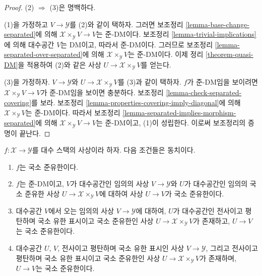 \begin{proof}
(2) $\Rightarrow$ (3)은 명백하다.

\medskip\noindent
(1)을 가정하고 $V \to \mathcal{Y}$를 (2)와 같이 택하자. 그러면
보조정리 \ref{lemma-base-change-separated}에 의해
$\mathcal{X} \times_\mathcal{Y} V \to V$는 준-DM이다.
보조정리 \ref{lemma-trivial-implications}에 의해 대수공간 $V$는 DM이고,
따라서 준-DM이다. 그러므로 보조정리
\ref{lemma-separated-over-separated}에 의해
$\mathcal{X} \times_\mathcal{Y} V$는 준-DM이다. 이제 정리
\ref{theorem-quasi-DM}을 적용하여 (2)와 같은 사상
$U \to \mathcal{X} \times_\mathcal{Y} V$를 얻는다.

\medskip\noindent
(3)을 가정하자. $V \to \mathcal{Y}$와
$U \to \mathcal{X} \times_\mathcal{Y} V$를 (3)과 같이 택하자.
$f$가 준-DM임을 보이려면
$\mathcal{X} \times_\mathcal{Y} V \to V$가 준-DM임을 보이면 충분하다.
보조정리 \ref{lemma-check-separated-covering}를 보라.
보조정리 \ref{lemma-properties-covering-imply-diagonal}에 의해
$\mathcal{X} \times_\mathcal{Y} V$는 준-DM이다. 따라서 보조정리
\ref{lemma-separated-implies-morphism-separated}에 의해
$\mathcal{X} \times_\mathcal{Y} V \to V$는 준-DM이고, (1)이 성립한다.
이로써 보조정리의 증명이 끝난다.
\end{proof}

\begin{lemma}
\label{lemma-characterize-locally-quasi-finite}
$f : \mathcal{X} \to \mathcal{Y}$를 대수 스택의 사상이라 하자.
다음 조건들은 동치이다.
\begin{enumerate}
\item $f$는 국소 준유한이다.
\item $f$는 준-DM이고, $V$가 대수공간인 임의의 사상
$V \to \mathcal{Y}$와 $U$가 대수공간인 임의의 국소 준유한 사상
$U \to \mathcal{X} \times_\mathcal{Y} V$에 대하여 사상 $U \to V$가
국소 준유한이다.
\item 대수공간 $V$에서 오는 임의의 사상 $V \to \mathcal{Y}$에 대하여,
$U$가 대수공간인 전사이고 평탄하며 국소 유한 표시이고 국소 준유한인
사상 $U \to \mathcal{X} \times_\mathcal{Y} V$가 존재하고,
$U \to V$는 국소 준유한이다.
\item 대수공간 $U$, $V$, 전사이고 평탄하며 국소 유한 표시인 사상
$V \to \mathcal{Y}$, 그리고 전사이고 평탄하며 국소 유한 표시이고
국소 준유한인 사상 $U \to \mathcal{X} \times_\mathcal{Y} V$가 존재하며,
$U \to V$는 국소 준유한이다.
\end{enumerate}
\end{lemma}

